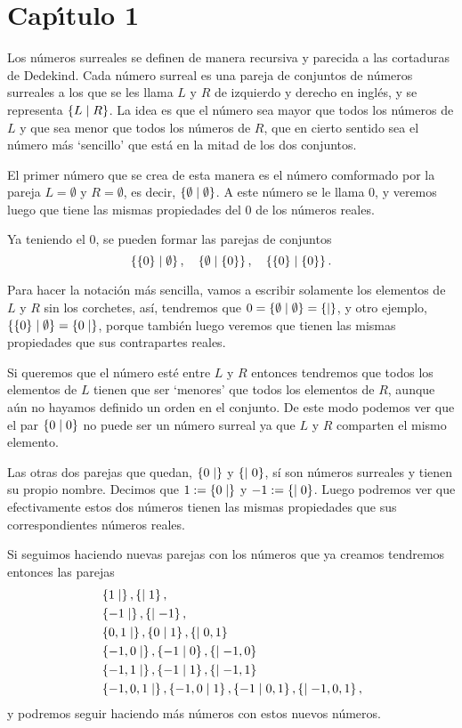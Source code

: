\chapter{Cap\'{\i}tulo 1}

    Los números surreales se definen de manera recursiva y parecida a las cortaduras de Dedekind. Cada n\'umero surreal es una pareja de conjuntos de n\'umeros surreales a los que se les llama $L$ y $R$ de izquierdo y derecho en ingl\'es, y se representa $\left\{L\mid R\right\}$. La idea es que el n\'umero sea mayor que todos los n\'umeros de $L$ y que sea menor que todos los n\'umeros de $R$, que en cierto sentido sea el n\'umero m\'as `sencillo' que est\'a en la mitad de los dos conjuntos.

    El primer n\'umero que se crea de esta manera es el n\'umero comformado por la pareja $L = \emptyset$ y $R=\emptyset$, es decir, $\left\{\emptyset\mid \emptyset\right\}$. A este n\'umero se le llama $0$, y veremos luego que tiene las mismas propiedades del $0$ de los n\'umeros reales.

    Ya teniendo el $0$, se pueden formar las parejas de conjuntos
    \[
        \left\{\{0\}\mid \emptyset\right\}, \quad \left\{\emptyset\mid \{0\}\right\}, \quad \left\{\{0\}\mid \{0\}\right\}.
    \]
    
    Para hacer la notaci\'on m\'as sencilla, vamos a escribir solamente los elementos de $L$ y $R$ sin los corchetes, as\'i, tendremos que $0=\left\{\emptyset\mid \emptyset\right\} = \left\{\mid \right\}$, y otro ejemplo, $\left\{\{0\}\mid \emptyset\right\} = \left\{0\mid \right\}$, porque tambi\'en luego veremos que tienen las mismas propiedades que sus contrapartes reales.

    Si queremos que el n\'umero est\'e entre $L$ y $R$ entonces tendremos que todos los elementos de $L$ tienen que ser `menores' que todos los elementos de $R$, aunque a\'un no hayamos definido un orden en el conjunto. De este modo podemos ver que el par $\left\{0\mid 0\right\}$ no puede ser un n\'umero surreal ya que $L$ y $R$ comparten el mismo elemento.

    Las otras dos parejas que quedan, $\left\{0\mid \right\}$ y $\left\{\mid 0\right\}$, s\'i son n\'umeros surreales y tienen su propio nombre. Decimos que $1 :=\left\{0\mid \right\}$ y $-1 :=\left\{\mid 0\right\}$. Luego podremos ver que efectivamente estos dos n\'umeros tienen las mismas propiedades que sus correspondientes n\'umeros reales.

    Si seguimos haciendo nuevas parejas con los n\'umeros que ya creamos tendremos entonces las parejas
    \begin{align*}
        &\left\{1\mid \right\}, \left\{\mid 1\right\},\\
        &\left\{-1\mid \right\}, \left\{\mid -1\right\}, \\
        &\left\{0,1\mid \right\}, \left\{0\mid 1\right\}, \left\{\mid 0,1\right\} \\
        &\left\{-1,0\mid \right\}, \left\{-1\mid 0\right\}, \left\{\mid -1,0\right\} \\
        &\left\{-1,1\mid \right\}, \left\{-1\mid 1\right\}, \left\{\mid -1,1\right\} \\
        &\left\{-1,0,1\mid \right\}, \left\{-1,0\mid 1\right\}, \left\{-1\mid 0,1\right\}, \left\{\mid -1,0,1\right\},
    \end{align*}
    y podremos seguir haciendo m\'as n\'umeros con estos nuevos n\'umeros.
    
